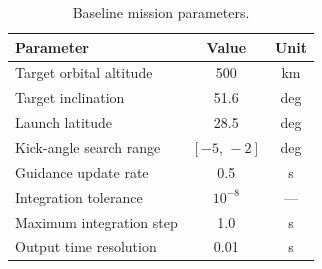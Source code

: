 \begin{table}[htbp]
  \centering
  \caption{Baseline mission parameters.}
  \label{tab:mission}
  \begin{tabular}{l c c}
    \toprule
    \textbf{Parameter} & \textbf{Value} & \textbf{Unit} \\
    \midrule
    Target orbital altitude   & 500    & km   \\
    Target inclination        & 51.6   & deg  \\
    Launch latitude           & 28.5   & deg  \\
    Kick-angle search range   & $[-5,\,-2]$ & deg \\
    Guidance update rate      & 0.5    & s    \\
    Integration tolerance     & $10^{-8}$ & --- \\
    Maximum integration step  & 1.0    & s    \\
    Output time resolution    & 0.01   & s    \\
    \bottomrule
  \end{tabular}
\end{table}
